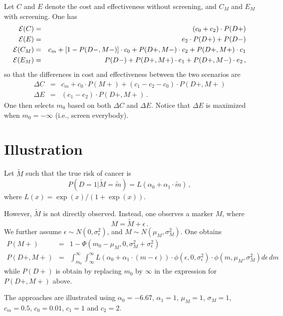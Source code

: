 \documentclass[11pt]{article}
\begin{document}
Let $C$ and $E$ denote the cost and effectiveness without screening, and $C_M$ and $E_M$ with screening. One has
\begin{eqnarray*}
{\cal E} (C) &=& (c_0+c_2)\cdot P(D+) \\
{\cal E} (E) &=& e_2\cdot P(D+) + P(D-) \\
{\cal E} (C_M) &=& c_m + [1-P(D-,M-)]\cdot c_0+P(D+,M-)\cdot c_2+P(D+,M+)\cdot c_1\\
{\cal E} (E_M) &=& P(D-) + P(D+,M+)\cdot e_1 + P(D+,M-)\cdot e_2 \,,
\end{eqnarray*}
so that the differences in cost and effectiveness between the two scenarios are 
\begin{eqnarray*}
\Delta C &=& c_m + c_0\cdot P(M+) + (c_1 - c_2 - c_0)\cdot P(D+,M+)\\
\Delta E &=& (e_1 - e_2)\cdot P(D+,M+)\,.
\end{eqnarray*}
One then selects $m_0$ based on both $\Delta C$ and $\Delta E$. Notice that $\Delta E$ is maximized when $m_0=-\infty$ (i.e., screen everybody). 

\section{Illustration}

Let $\tilde{M}$ such that the true risk of cancer is
\begin{equation}\label{model_D}
P(D=1|\tilde{M}=\tilde{m})=L(\alpha_0 + \alpha_1\cdot \tilde{m})\,,
\end{equation} 
where $L(x)=\exp(x)/(1+\exp(x))$.

However, $\tilde{M}$ is not directly observed. Instead, one observes a marker $M$, where
\begin{equation}\label{model_M}
M = \tilde{M} + \epsilon\,.
\end{equation}
We further assume $\epsilon\sim N(0,\sigma_\epsilon^2)$, and $M\sim N(\mu_M,\sigma_M^2)$. One obtains
\begin{eqnarray*}
P(M+) &=& 1-\Phi\left(m_0-\mu_M,0,\sigma_M^2 +\sigma_\epsilon^2 \right)   \\
P(D+,M+) &=& \int_{m_0}^\infty \int_{\infty}^{\infty}L(\alpha_0+\alpha_1\cdot(m-\epsilon))\cdot \phi(\epsilon,0,\sigma_\epsilon^2)
  \cdot \phi(m,\mu_M,\sigma_M^2)d\epsilon \, dm
\end{eqnarray*}
while $P(D+)$ is obtain by replacing $m_0$ by $\infty$ in the expression for $P(D+,M+)$ above. 

The approaches are illustrated using $\alpha_0 = -6.67$, $\alpha_1 = 1$,
$\mu_M = 1$, $\sigma_M=1$, $c_m=0.5$, $c_0=0.01$, $c_1=1$ and $c_2=2$.
\end{document}
